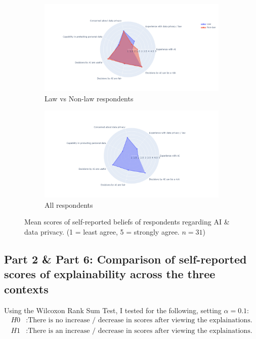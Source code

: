 \begin{figure}[!ht]
    \begin{subfigure}[b]{1\textwidth}
      \centering
      \includegraphics[width=1\linewidth]{figures/demo_3.png}
      \caption{Law vs Non-law respondents}
    \end{subfigure}
    \hfill
    \begin{subfigure}[b]{1\textwidth}
      \centering
      \includegraphics[width=1\linewidth]{figures/demo_4.png}
      \caption{All respondents}
    \end{subfigure}
    \caption{Mean scores of self-reported beliefs of respondents regarding AI \& data privacy. (1 = least agree, 5 = strongly agree. $n=31$)}
    \label{fig:demo_3}
\end{figure}

\subsection{Part 2 \& Part 6: Comparison of self-reported scores of explainability across the three contexts}
Using the Wilcoxon Rank Sum Test, I tested for the following, setting $\alpha = 0.1$: 
\begin{align*}
    H0&: \text{There is no increase / decrease in scores after viewing the explainations.} \\
    H1&: \text{There is an increase / decrease in scores after viewing the explainations.}
\end{align*}

